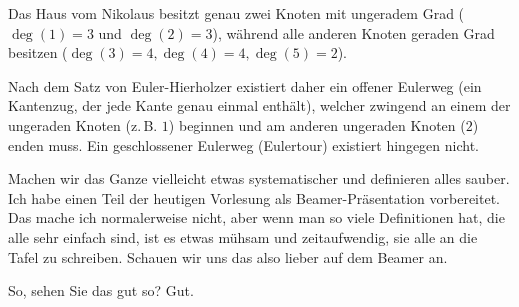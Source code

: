 \begin{math-stroke}
\begin{ai-tikz-planner-invisible-content}
\end{ai-tikz-planner-invisible-content}
\begin{center}
\end{center}

\begin{explanation-of-steps}
Das Haus vom Nikolaus besitzt genau zwei Knoten mit ungeradem Grad ($\deg(1)=3$ und $\deg(2)=3$), während alle anderen Knoten geraden Grad besitzen ($\deg(3)=4, \deg(4)=4, \deg(5)=2$).

Nach dem Satz von Euler-Hierholzer existiert daher ein offener Eulerweg (ein Kantenzug, der jede Kante genau einmal enthält), welcher zwingend an einem der ungeraden Knoten (z.\,B. $1$) beginnen und am anderen ungeraden Knoten ($2$) enden muss. Ein geschlossener Eulerweg (Eulertour) existiert hingegen nicht.
\end{explanation-of-steps}
\end{math-stroke}

\begin{spoken-clean}[00:13:02 - 00:13:36]
Machen wir das Ganze vielleicht etwas systematischer und definieren alles sauber. Ich habe einen Teil der heutigen Vorlesung als Beamer-Präsentation vorbereitet. Das mache ich normalerweise nicht, aber wenn man so viele Definitionen hat, die alle sehr einfach sind, ist es etwas mühsam und zeitaufwendig, sie alle an die Tafel zu schreiben. Schauen wir uns das also lieber auf dem Beamer an.

So, sehen Sie das gut so? Gut.
\end{spoken-clean}


